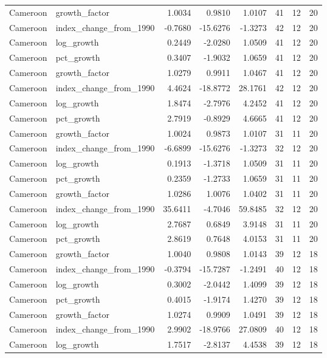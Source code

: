 \begin{table}
\begin{tabular}[t]{llrrrrrr}
\addlinespace
Cameroon & growth\_factor & 1.0034 & 0.9810 & 1.0107 & 41 & 12 & 20\\
Cameroon & index\_change\_from\_1990 & -0.7680 & -15.6276 & -1.3273 & 42 & 12 & 20\\
Cameroon & log\_growth & 0.2449 & -2.0280 & 1.0509 & 41 & 12 & 20\\
Cameroon & pct\_growth & 0.3407 & -1.9032 & 1.0659 & 41 & 12 & 20\\
Cameroon & growth\_factor & 1.0279 & 0.9911 & 1.0467 & 41 & 12 & 20\\
\addlinespace
Cameroon & index\_change\_from\_1990 & 4.4624 & -18.8772 & 28.1761 & 42 & 12 & 20\\
Cameroon & log\_growth & 1.8474 & -2.7976 & 4.2452 & 41 & 12 & 20\\
Cameroon & pct\_growth & 2.7919 & -0.8929 & 4.6665 & 41 & 12 & 20\\
Cameroon & growth\_factor & 1.0024 & 0.9873 & 1.0107 & 31 & 11 & 20\\
Cameroon & index\_change\_from\_1990 & -6.6899 & -15.6276 & -1.3273 & 32 & 12 & 20\\
\addlinespace
Cameroon & log\_growth & 0.1913 & -1.3718 & 1.0509 & 31 & 11 & 20\\
Cameroon & pct\_growth & 0.2359 & -1.2733 & 1.0659 & 31 & 11 & 20\\
Cameroon & growth\_factor & 1.0286 & 1.0076 & 1.0402 & 31 & 11 & 20\\
Cameroon & index\_change\_from\_1990 & 35.6411 & -4.7046 & 59.8485 & 32 & 12 & 20\\
Cameroon & log\_growth & 2.7687 & 0.6849 & 3.9148 & 31 & 11 & 20\\
\addlinespace
Cameroon & pct\_growth & 2.8619 & 0.7648 & 4.0153 & 31 & 11 & 20\\
Cameroon & growth\_factor & 1.0040 & 0.9808 & 1.0143 & 39 & 12 & 18\\
Cameroon & index\_change\_from\_1990 & -0.3794 & -15.7287 & -1.2491 & 40 & 12 & 18\\
Cameroon & log\_growth & 0.3002 & -2.0442 & 1.4099 & 39 & 12 & 18\\
Cameroon & pct\_growth & 0.4015 & -1.9174 & 1.4270 & 39 & 12 & 18\\
\addlinespace
Cameroon & growth\_factor & 1.0274 & 0.9909 & 1.0491 & 39 & 12 & 18\\
Cameroon & index\_change\_from\_1990 & 2.9902 & -18.9766 & 27.0809 & 40 & 12 & 18\\
Cameroon & log\_growth & 1.7517 & -2.8137 & 4.4538 & 39 & 12 & 18\\

\end{tabular}
\end{table}
